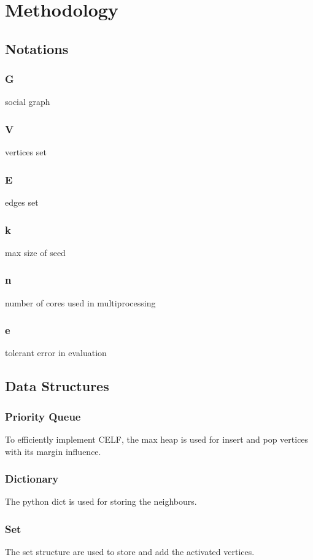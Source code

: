 \documentclass[9pt,shortpaper,twoside,web]{ieeecolor}
\begin{document}
\section{Methodology}
\subsection{Notations}
\subsubsection{G}social graph
\subsubsection{V}vertices set
\subsubsection{E}edges set
\subsubsection{k}max size of seed
\subsubsection{n}number of cores used in multiprocessing
\subsubsection{e}tolerant error in evaluation


\subsection{Data Structures}
\subsubsection{Priority Queue}
To efficiently implement CELF, the max heap is used for insert and pop vertices with its margin influence.
\subsubsection{Dictionary}
The python dict is used for storing the neighbours. 
\subsubsection{Set}
The set structure are used to store and add the activated vertices.
\end{document}
